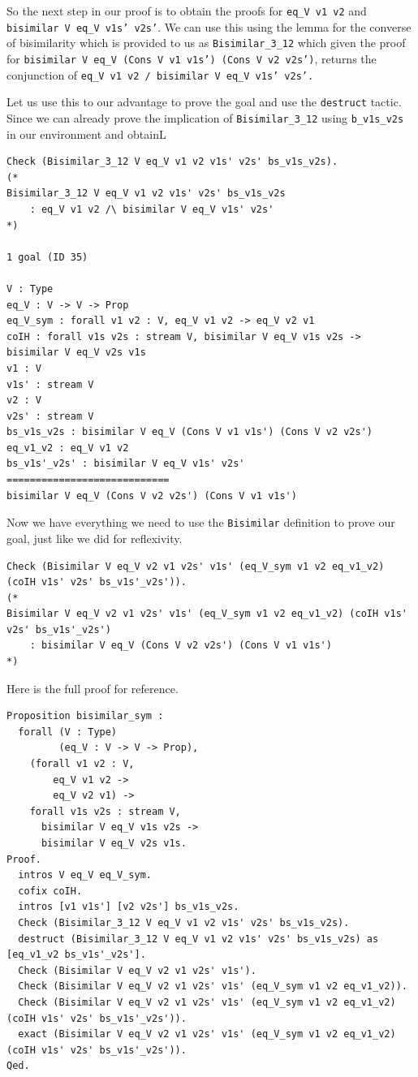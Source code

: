 \documentclass{article}
\begin{document}
So the next step in our proof is to obtain the proofs for \texttt{eq\_V v1 v2} and \texttt{bisimilar V eq\_V v1s' v2s'}. We can use this using the lemma for the converse of bisimilarity which is provided to us as \texttt{Bisimilar\_3\_12} which given the proof for \texttt{bisimilar V eq\_V (Cons V v1 v1s') (Cons V v2 v2s')}, returns the conjunction of \texttt{eq\_V v1 v2 /\ bisimilar V eq\_V v1s' v2s'.}

Let us use this to our advantage to prove the goal and use the \texttt{destruct} tactic. Since we can already prove the implication of \texttt{Bisimilar\_3\_12} using \texttt{b\_v1s\_v2s} in our environment and obtainL 

\begin{lstlisting}
Check (Bisimilar_3_12 V eq_V v1 v2 v1s' v2s' bs_v1s_v2s).
(* 
Bisimilar_3_12 V eq_V v1 v2 v1s' v2s' bs_v1s_v2s
    : eq_V v1 v2 /\ bisimilar V eq_V v1s' v2s'
*)

1 goal (ID 35)

V : Type
eq_V : V -> V -> Prop
eq_V_sym : forall v1 v2 : V, eq_V v1 v2 -> eq_V v2 v1
coIH : forall v1s v2s : stream V, bisimilar V eq_V v1s v2s -> bisimilar V eq_V v2s v1s
v1 : V
v1s' : stream V
v2 : V
v2s' : stream V
bs_v1s_v2s : bisimilar V eq_V (Cons V v1 v1s') (Cons V v2 v2s')
eq_v1_v2 : eq_V v1 v2
bs_v1s'_v2s' : bisimilar V eq_V v1s' v2s'
============================
bisimilar V eq_V (Cons V v2 v2s') (Cons V v1 v1s')

\end{lstlisting}

Now we have everything we need to use the \texttt{Bisimilar} definition to prove our goal, just like we did for reflexivity.

\begin{lstlisting}
Check (Bisimilar V eq_V v2 v1 v2s' v1s' (eq_V_sym v1 v2 eq_v1_v2) (coIH v1s' v2s' bs_v1s'_v2s')).
(*
Bisimilar V eq_V v2 v1 v2s' v1s' (eq_V_sym v1 v2 eq_v1_v2) (coIH v1s' v2s' bs_v1s'_v2s')
    : bisimilar V eq_V (Cons V v2 v2s') (Cons V v1 v1s')
*)
\end{lstlisting}

Here is the full proof for reference.

\begin{lstlisting}
Proposition bisimilar_sym :
  forall (V : Type)
         (eq_V : V -> V -> Prop),
    (forall v1 v2 : V,
        eq_V v1 v2 ->
        eq_V v2 v1) ->
    forall v1s v2s : stream V,
      bisimilar V eq_V v1s v2s ->
      bisimilar V eq_V v2s v1s.
Proof.
  intros V eq_V eq_V_sym.
  cofix coIH.
  intros [v1 v1s'] [v2 v2s'] bs_v1s_v2s.
  Check (Bisimilar_3_12 V eq_V v1 v2 v1s' v2s' bs_v1s_v2s).
  destruct (Bisimilar_3_12 V eq_V v1 v2 v1s' v2s' bs_v1s_v2s) as [eq_v1_v2 bs_v1s'_v2s'].
  Check (Bisimilar V eq_V v2 v1 v2s' v1s').
  Check (Bisimilar V eq_V v2 v1 v2s' v1s' (eq_V_sym v1 v2 eq_v1_v2)).
  Check (Bisimilar V eq_V v2 v1 v2s' v1s' (eq_V_sym v1 v2 eq_v1_v2) (coIH v1s' v2s' bs_v1s'_v2s')).
  exact (Bisimilar V eq_V v2 v1 v2s' v1s' (eq_V_sym v1 v2 eq_v1_v2) (coIH v1s' v2s' bs_v1s'_v2s')).
Qed.
\end{lstlisting}
\end{document}
